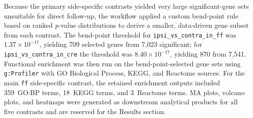 \documentclass[12pt]{article}
\begin{document}
Because the primary side-specific contrasts yielded very large significant-gene sets unsuitable
for direct follow-up, the workflow applied a custom bend-point rule based on ranked
\textit{p}-value distributions to derive a smaller, data-driven gene subset from each contrast.
The bend-point threshold for \texttt{ipsi\_vs\_contra\_in\_ff} was $1.37 \times 10^{-17}$,
yielding 709 selected genes from 7{,}023 significant; for \texttt{ipsi\_vs\_contra\_in\_cre}
the threshold was $8.40 \times 10^{-17}$, yielding 870 from 7{,}541.
Functional enrichment was then run on the bend-point-selected gene sets using \texttt{g:Profiler}
with GO Biological Process, KEGG, and Reactome sources.
For the main \texttt{ff} side-specific contrast, the retained enrichment outputs included
359~GO:BP terms, 18~KEGG terms, and 3~Reactome terms.
MA plots, volcano plots, and heatmaps were generated as downstream analytical products for all
five contrasts and are reserved for the Results section.
\end{document}
